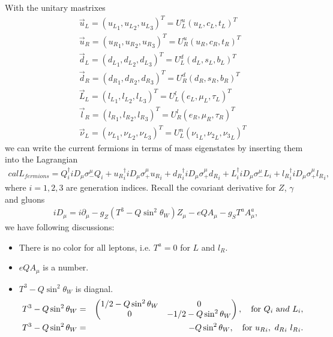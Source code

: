 \documentclass[11pt]{article}
\def\del{{\partial}}
\begin{document}
\section{ }
With the unitary mastrixes
\begin{eqnarray}
   && \vec{u}_L=({u_L}_1, {u_L}_2, {u_L}_3)^T = U^u_L (u_L, c_L, t_L)^T \\
   && \vec{u}_R= ({u_R}_1, {u_R}_2, {u_R}_3)^T = U^u_R (u_R, c_R, t_R)^T \\
   &&  \vec{d}_L=({d_L}_1, {d_L}_2, {d_L}_3)^T = U^d_L (d_L, s_L, b_L)^T \\
   && \vec{d}_R=({d_R}_1, {d_R}_2, {d_R}_3)^T = U^d_R (d_R, s_R, b_R)^T  \\
   && \vec{L}_L=({l_L}_1, {l_L}_2, {l_L}_3)^T = U^l_L (e_L, \mu_L, \tau_L)^T \\
   && \vec{l}_R=({l_R}_1, {l_R}_2, {l_R}_3)^T = U^l_R (e_R, \mu_R, \tau_R)^T \\
   && \vec{\nu}_L=({\nu_L}_1, {\nu_L}_2, {\nu_L}_3)^T = U^n_L ({\nu_1}_L, {\nu_2}_L, {\nu_3}_L)^T 
  \end{eqnarray}
we can write the current fermions in terms of mass eigenstates by inserting them into the Lagrangian
\begin{eqnarray}
  {cal L}_{fermions} =  Q_i^\dagger iD_\mu \sigma_-^\mu Q_i
  + {u_R}_i^\dagger iD_\mu \sigma_+^\mu {u_R}_i
  + {d_R}_i^\dagger iD_\mu \sigma_+^\mu {d_R}_i
  +  L_i^\dagger iD_\mu \sigma_-^\mu L_i
  + {l_R}_i^\dagger iD_\mu \sigma_+^\mu {l_R}_i,
\end{eqnarray}
where $i=1,2,3$ are generation indices. Recall the covariant derivative for $Z$, $\gamma$ and gluons
\begin{eqnarray}
  iD_\mu = i\del_\mu -g_Z (T^3-Q \sin^2\theta_W ) Z_\mu -e Q A_\mu -g_S T^a A^a_\mu,
\end{eqnarray}
we have following discussions:
\begin{itemize}
    \item There is no color for all leptons, i.e. $T^a=0$ for $L$ and $l_R$.
    \item $eQA_\mu$ is a number.
    \item $T^3-Q \sin^2\theta_W $ is diagnal.
    \begin{eqnarray}
        T^3-Q \sin^2\theta_W &=&
        \begin{pmatrix}
            1/2-Q \sin^2\theta_W &0 \\ 
            0 & -1/2-Q \sin^2\theta_W 
        \end{pmatrix},~~~{\rm for}~Q_i~{\text and}~L_i , \\ 
        T^3-Q \sin^2\theta_W &=& -Q \sin^2\theta_W, ~~~{\rm for}~{u_R}_i,~{d_R}_i~ {l_R}_i.
    \end{eqnarray}
\end{itemize}
\end{document}

